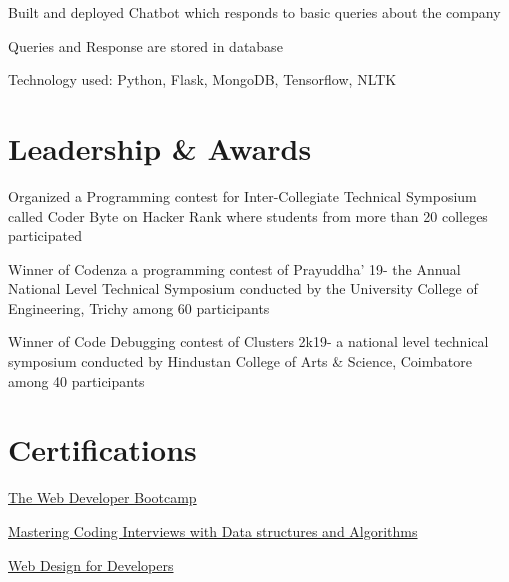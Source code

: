 \documentclass[]{deedy-resume-openfont}
\begin{document}
\begin{minipage}[t]{0.66\textwidth}
\begin{tightemize}
\item Built and deployed Chatbot which responds to basic queries about the company
\item Queries and Response are stored in database
\item Technology used: Python, Flask, MongoDB, Tensorflow, NLTK
\end{tightemize}
\sectionsep

\section{Leadership \& Awards}
\vspace{\topsep} %

\begin{tightemize}
\item Organized a Programming contest for Inter-Collegiate Technical Symposium called Coder Byte on Hacker Rank where students from more than 20 colleges participated
\item Winner of Codenza a programming contest of Prayuddha' 19- the Annual National Level Technical Symposium conducted by the University College of Engineering, Trichy among 60 participants
\item Winner of Code Debugging contest of Clusters 2k19- a national level technical symposium conducted by Hindustan College of Arts \& Science, Coimbatore among 40 participants 
\end{tightemize}
\sectionsep

\section{Certifications}
\vspace{\topsep} %
\begin{tightemize}
\item{\href{https://www.udemy.com/certificate/UC-3ea21109-140f-4044-a913-696cba243deb/}{The Web Developer Bootcamp }}  \\
\item{\href{https://www.udemy.com/certificate/UC-c2872b46-41fb-4b50-8d4b-a303fd93eee8/}{Mastering Coding Interviews with   Data structures and Algorithms}}  \\
\item{\href{https://www.udemy.com/certificate/UC-462a6170-a233-44fd-b213-4e6812f30a26/}{Web Design for Developers}}  \\
\end{tightemize}

\sectionsep
\end{minipage} 
\end{document}
